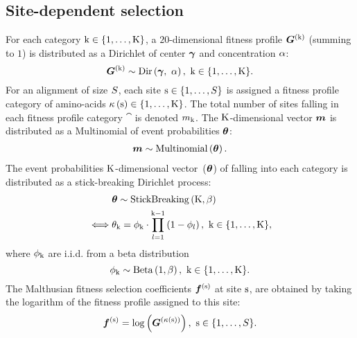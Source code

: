 \subsection{Site-dependent selection}
\label{sec:profiles}
For each category $\text{k} \in \{1, \hdots, \text{K}\}$, a $20$-dimensional fitness profile $\bm{G}^{(\text{k})}$ (summing to $1$) is distributed as a Dirichlet of center $\bm{\gamma}$ and concentration $\alpha$:
\begin{equation}
\label{eq:DistribBase}
\Base\catexp \sim \mathrm{Dir}\left( \Basecenter,\ \baseconc \right),\ \Setcat.
\end{equation}
For an alignment of size $S$, each site $\text{s} \in \{1, \hdots, S\}$ is assigned a fitness profile category of amino-acids $\kappa\left(\text{s}\right) \in \{1, \hdots, \text{K}\} $.
The total number of sites falling in each fitness profile category $\cat$ is denoted $m_{\text{k}}$.
The $\text{K}$-dimensional vector $\bm{m}$ is distributed as a Multinomial of event probabilities $\bm{\theta}$:
\begin{align}
\label{eq:DistribMultinomial}
\catMultiVar \sim \mathrm{Multinomial}\left( \StickBreaking \right).
\end{align}
The event probabilities $\text{K}$-dimensional vector~($\bm{\theta}$) of falling into each category is distributed as a stick-breaking Dirichlet process:
\begin{align}
\label{eq:DistribStickBreaking}
\begin{split}
& \StickBreaking \sim \mathrm{StickBreaking}\left( \Ncat, \stickbreakinghyper \right)\\
\iff & \stickbreaking_{\cat} = \stick_{\cat}\cdot \prod _{{\indice=1}}^{{\cat-1}}\left(1-\stick_{\indice}\right),\ \Setcat,
\end{split}
\end{align}
where $\phi_{\text{k}}$ are i.i.d.
from a beta distribution
\begin{equation}
\label{eq:Beta}
\stick_{\cat} \sim \mathrm{Beta}\left( 1, \stickbreakinghyper \right),\ \Setcat.
\end{equation}
The Malthusian fitness selection coefficients $\bm{f}^{(\text{s})}$ at site $\text{s}$, are obtained by taking the logarithm of the fitness profile assigned to this site:
\begin{equation}
\label{eq:sitefitness}
\Fit\siteexp = \log \left( \Base^{\left( \catsite \right)} \right),\ \Setsite.
\end{equation}

